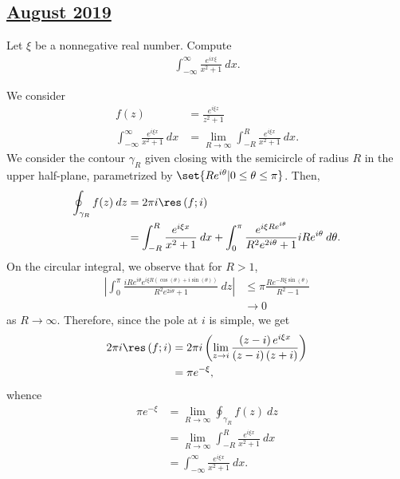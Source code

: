 \documentclass[10pt]{mypackage}
\begin{document}
\subsection{\href{https://math.virginia.edu/graduate/exams/analysis/2019Aug_complex.html}{August 2019}}%
\begin{problem}[Problem 1]
  Let $\xi$ be a nonnegative real number. Compute
  \begin{align*}
    \int_{-\infty}^{\infty} \frac{e^{ix\xi}}{x^2 + 1}\:dx.
  \end{align*}
\end{problem}
\begin{solution}
  We consider
  \begin{align*}
    f(z) &= \frac{e^{i\xi z}}{z^2 + 1}\\
    \int_{-\infty}^{\infty} \frac{e^{i\xi x}}{x^2 + 1}\:dx &= \lim_{R\rightarrow\infty} \int_{-R}^{R} \frac{e^{i\xi x}}{x^2 + 1}\:dx.
  \end{align*}
  We consider the contour $\gamma_R$ given closing with the semicircle of radius $R$ in the upper half-plane, parametrized by $\set{Re^{i\theta} | 0\leq \theta \leq \pi}$. Then,
  \begin{align*}
    \oint_{\gamma_R}^{} f(z)\:dz &= 2\pi i \res\left( f;i \right)\\
                                 &= \int_{-R}^{R} \frac{e^{i\xi x}}{x^2 + 1}\:dx + \int_{0}^{\pi} \frac{e^{i\xi Re^{i\theta}}}{R^2e^{2i\theta} + 1}iRe^{i\theta}\:d\theta.
  \end{align*}
  On the circular integral, we observe that for $R > 1$,
  \begin{align*}
    \left\vert \int_{0}^{\pi} \frac{iRe^{i\theta}e^{i\xi R\left( \cos\left( \theta \right) + i\sin\left( \theta \right) \right)}}{R^2 e^{2i\theta} + 1}\:dz \right\vert &\leq \pi \frac{Re^{-R\xi \sin\left( \theta \right)}}{R^2 - 1}\\
                                                                                                                                                                              &\rightarrow 0
  \end{align*}
  as $R\rightarrow\infty$. Therefore, since the pole at $i$ is simple, we get
  \begin{align*}
    2\pi i \res\left( f;i \right) &= 2\pi i \left( \lim_{z\rightarrow i} \frac{\left( z-i \right)e^{i\xi x}}{\left( z-i \right)\left( z+i \right)} \right)\\
                                  &= \pi e^{-\xi},
  \end{align*}
  whence
  \begin{align*}
    \pi e^{-\xi} &= \lim_{R\rightarrow\infty} \oint_{\gamma_R}^{} f(z)\:dz\\
                 &= \lim_{R\rightarrow\infty} \int_{-R}^{R} \frac{e^{i\xi x}}{x^2 + 1}\:dx\\
                 &= \int_{-\infty}^{\infty} \frac{e^{i\xi x}}{x^2 + 1}\:dx.
  \end{align*}
\end{solution}
\end{document}
